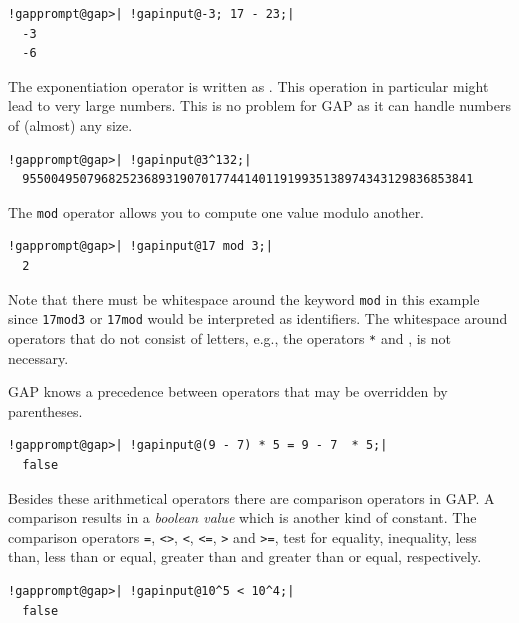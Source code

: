 \documentclass[a4paper,11pt]{report}
\begin{document}
{{ 
\begin{Verbatim}[commandchars=!@|,fontsize=\small,frame=single,label=Example]
  !gapprompt@gap>| !gapinput@-3; 17 - 23;|
  -3
  -6
\end{Verbatim}
 

 The exponentiation operator is written as \texttt{\texttt{}}. This operation in particular might lead to very large numbers. This is no
problem for \textsf{GAP} as it can handle numbers of (almost) any size. 

 
\begin{Verbatim}[commandchars=!@|,fontsize=\small,frame=single,label=Example]
  !gapprompt@gap>| !gapinput@3^132;|
  955004950796825236893190701774414011919935138974343129836853841
\end{Verbatim}
 

 The \texttt{mod} operator allows you to compute one value modulo another. 

 
\begin{Verbatim}[commandchars=!@|,fontsize=\small,frame=single,label=Example]
  !gapprompt@gap>| !gapinput@17 mod 3;|
  2
\end{Verbatim}
 

 Note that there must be whitespace around the keyword \texttt{mod} in this example since \texttt{17mod3} or \texttt{17mod} would be interpreted as identifiers. The whitespace around operators that do
not consist of letters, e.g., the operators \texttt{*} and \texttt{\texttt{}}, is not necessary. 

 \textsf{GAP} knows a precedence between operators that may be overridden by parentheses. 

 
\begin{Verbatim}[commandchars=!@|,fontsize=\small,frame=single,label=Example]
  !gapprompt@gap>| !gapinput@(9 - 7) * 5 = 9 - 7  * 5;|
  false
\end{Verbatim}
 

 Besides these arithmetical operators there are comparison operators in \textsf{GAP}. A comparison results in a \emph{boolean value} which is another kind of constant. The comparison operators \texttt{=}, \texttt{{\textless}{\textgreater}}, \texttt{{\textless}}, \texttt{{\textless}=}, \texttt{{\textgreater}} and \texttt{{\textgreater}=}, test for equality, inequality, less than, less than or equal, greater than
and greater than or equal, respectively. 

 
\begin{Verbatim}[commandchars=!@|,fontsize=\small,frame=single,label=Example]
  !gapprompt@gap>| !gapinput@10^5 < 10^4;|
  false
\end{Verbatim}
 

}}
\end{document}
